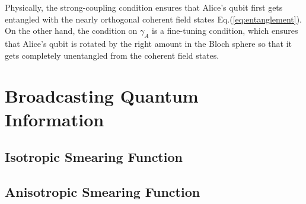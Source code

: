 \documentclass[a4paper,12pt]{article}
\begin{document}
Physically, the strong-coupling condition ensures that Alice's qubit first gets entangled with the nearly orthogonal coherent field states Eq.(\ref{eq:entanglement}).
On the other hand, the condition on $\gamma_A$ is a fine-tuning condition, which ensures that Alice's qubit is rotated by the right amount in the Bloch sphere so that it gets completely unentangled from the coherent field states\cite{PhysRevD.96.065008}\cite{PhysRevD.101.036014}. 



\section{Broadcasting Quantum Information}

\subsection*{Isotropic Smearing Function}

\subsection*{Anisotropic Smearing Function}

\appendix

\acknowledgments

\end{document}
